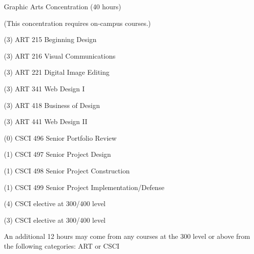 \begin{reqgroup}{Graphic Arts Concentration  (40 hours)}
\begin{center}%
(This concentration requires on-campus courses.)\vspace{-0.5em}%
\end{center}%
\begin{checklist}
\begin{minipage}[t]{0.5\linewidth}
	\item (3) ART 215 Beginning Design
	\item (3) ART 216 Visual Communications
	\item (3) ART 221 Digital Image Editing
	\item (3) ART 341 Web Design I
	\item (3) ART 418 Business of Design
	\item (3) ART 441 Web Design II
\end{minipage}
\begin{minipage}[t]{0.5\linewidth}
	\item (0) CSCI 496 Senior Portfolio Review
	\item (1) CSCI 497 Senior Project Design
	\item (1) CSCI 498 Senior Project Construction
	\item (1) CSCI 499 Senior Project Implementation/Defense
	\item (4) CSCI elective at 300/400 level
	\item (3) CSCI elective at 300/400 level
\end{minipage}
\end{checklist}

\tcblower

An additional 12 hours may come from any courses at the 300 level or above from the following categories: ART or CSCI
\begin{checklist}
\begin{minipage}[t]{0.5\linewidth}
	\blankReq
	\blankReq
\end{minipage}
\begin{minipage}[t]{0.5\linewidth}
	\blankReq
	\blankReq
\end{minipage}
\end{checklist}
\end{reqgroup}

